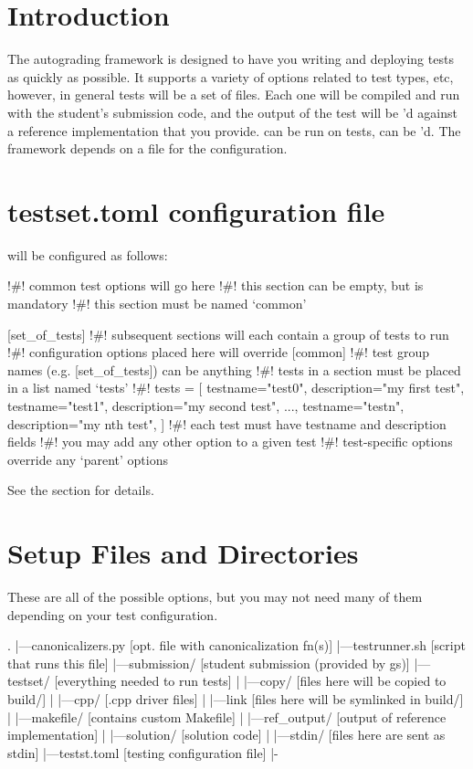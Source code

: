 \documentclass[11pt]{report}
\begin{document}
\section*{Introduction}
The autograding framework is designed to have you writing and deploying tests as quickly as possible. 
It supports a variety of options related to test types, etc, however, in general tests will be a 
set of  files. Each one will be compiled and run with the student's submission code,
and the output of the test will be 'd against a reference implementation that you provide.
 can be run on tests,  can be 'd. The framework depends on a
 file for the configuration. 
\section*{testset.toml configuration file}
 will be configured as follows:
\begin{bashcodeblock}
[common]
!\#! common test options will go here
!\#! this section can be empty, but is mandatory
!\#! this section must be named `common' 

[set_of_tests] 
!\#! subsequent sections will each contain a group of tests to run
!\#! configuration options placed here will override [common]
!\#! test group names (e.g. [set_of_tests]) can be anything
!\#! tests in a section must be placed in a list named `tests'
!\#! tests = [
      {testname="test0", description="my first test"},
      {testname="test1", description="my second test"},
      ..., 
      {testname="testn", description="my nth test"},
]
!\#! each test must have testname and description fields
!\#! you may add any other option to a given test
!\#! test-specific options override any `parent' options
\end{bashcodeblock}
See the section  for details. 

\section*{Setup Files and Directories}
These are all of the possible options, but you may not need many of them 
depending on your test configuration.
\begin{bashcodeblock}
.
|---canonicalizers.py [opt. file with canonicalization fn(s)]
|---testrunner.sh     [script that runs this file]
|---submission/       [student submission (provided by gs)]
|---testset/          [everything needed to run tests]
|   |---copy/         [files here will be copied to build/]
|   |---cpp/          [.cpp driver files]
|   |---link          [files here will be symlinked in build/]
|   |---makefile/     [contains custom Makefile]
|   |---ref_output/   [output of reference implementation]
|   |---solution/     [solution code]
|   |---stdin/        [files here are sent as stdin]
|---testst.toml       [testing configuration file]
|-
\end{bashcodeblock}
\end{document}
